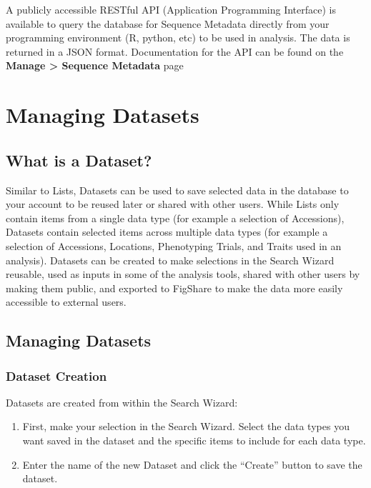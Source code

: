 \documentclass[
  12pt,
]{book}
\begin{document}
A publicly accessible RESTful API (Application Programming Interface) is available to query the database for Sequence Metadata directly from your programming environment (R, python, etc) to be used in analysis. The data is returned in a JSON format. Documentation for the API can be found on the \textbf{Manage \textgreater{} Sequence Metadata} page

\hypertarget{managing-datasets}{%
\chapter{Managing Datasets}\label{managing-datasets}}

\hypertarget{what-is-a-dataset}{%
\section{What is a Dataset?}\label{what-is-a-dataset}}

Similar to Lists, Datasets can be used to save selected data in the database to your account to be reused later or shared with other users. While Lists only contain items from a single data type (for example a selection of Accessions), Datasets contain selected items across multiple data types (for example a selection of Accessions, Locations, Phenotyping Trials, and Traits used in an analysis). Datasets can be created to make selections in the Search Wizard reusable, used as inputs in some of the analysis tools, shared with other users by making them public, and exported to FigShare to make the data more easily accessible to external users.

\hypertarget{managing-datasets-1}{%
\section{Managing Datasets}\label{managing-datasets-1}}

\hypertarget{dataset-creation}{%
\subsection{Dataset Creation}\label{dataset-creation}}

Datasets are created from within the Search Wizard:

\begin{enumerate}
\def\labelenumi{\arabic{enumi}.}
\item
  First, make your selection in the Search Wizard. Select the data types you want saved in the dataset and the specific items to include for each data type.
\item
  Enter the name of the new Dataset and click the ``Create'' button to save the dataset.
\end{enumerate}
\end{document}

